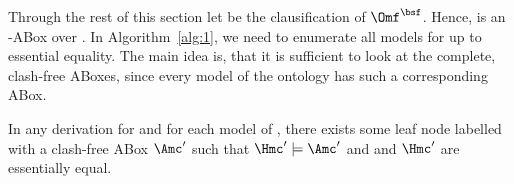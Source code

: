 


Through the rest of this section let \CA be the clausification of $\Omf^{\bsf}$. Hence, \A is an \LM-ABox over
\Msig.
%
In Algorithm~\ref{alg:1}, we need to enumerate all models for \Bmfb up to essential equality. The
main idea is, that it is sufficient to look at the complete, clash-free ABoxes, since every model of
the ontology has such a corresponding ABox.

\begin{lemma}\label{lem:model-has-abox}
  In any derivation for \CA and for each model \Hmc of \CA, there exists some leaf node labelled with
  a clash-free ABox $\A'$ such that $\Hmc'\models\A'$ and \Hmc and $\Hmc'$ are essentially equal.
\end{lemma}
